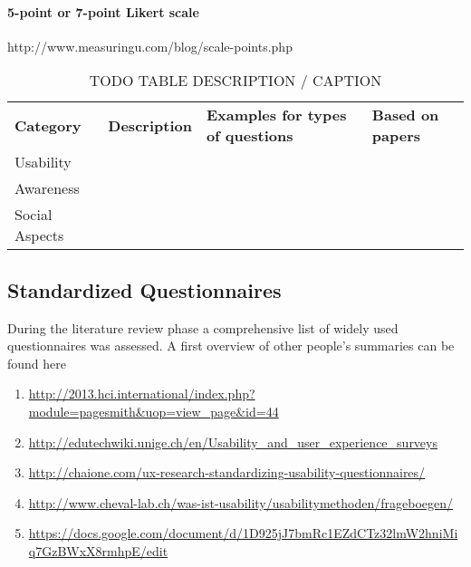 \paragraph{5-point or 7-point Likert scale}
http://www.measuringu.com/blog/scale-points.php





\label{table:ASDFTODO}

\begin{table*}[htbp]
  \centering
  \caption{TODO TABLE DESCRIPTION / CAPTION}

    \begin{tabular}{llll}
    \textbf{Category}       & \textbf{Description} & \textbf{Examples for types of questions} & \textbf{Based on papers} \\
    Usability      & ~           & ~                               & ~               \\
    Awareness      & ~           & ~                               & ~               \\
    Social Aspects & ~           & ~                               & ~               \\
    \end{tabular}
    

\end{table*}





\subsection{Standardized Questionnaires}


	During the literature review phase a comprehensive list of widely used questionnaires was assessed. A first overview of other people's summaries can be found here

	\begin{enumerate}
	\item \url{http://2013.hci.international/index.php?module=pagesmith&uop=view_page&id=44}
	\item \url{http://edutechwiki.unige.ch/en/Usability_and_user_experience_surveys}
	\item \url{http://chaione.com/ux-research-standardizing-usability-questionnaires/}
	\item \url{http://www.cheval-lab.ch/was-ist-usability/usabilitymethoden/frageboegen/}
	\item \url{https://docs.google.com/document/d/1D925jJ7bmRc1EZdCTz32lmW2hniMiq7GzBWxX8rmhpE/edit}
	\end{enumerate}

